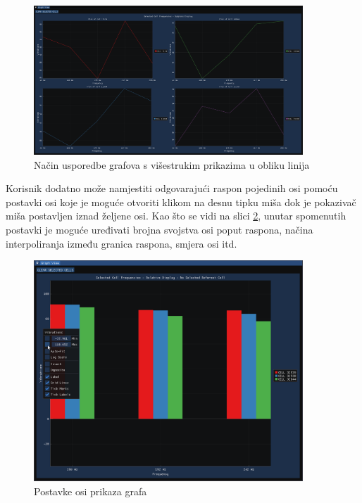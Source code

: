 \documentclass[times, utf8, diplomski]{fer}
\begin{document}
\begin{figure}[H]
	\centering
	\includegraphics[width=0.9\textwidth]{subplots_graph_display_lines.png}
	\caption{Način usporedbe grafova s višestrukim prikazima u obliku linija}
    \label{fig:subplots_graph_display_lines}
\end{figure}

Korisnik dodatno može namjestiti odgovarajući raspon pojedinih osi pomoću postavki osi koje je moguće otvoriti klikom na desnu tipku miša dok je pokazivač miša postavljen iznad željene osi. Kao što se vidi na slici \ref{fig:graph-axis-settings}, unutar spomenutih postavki je moguće uređivati brojna svojstva osi poput raspona, načina interpoliranja između granica raspona, smjera osi itd.

\begin{figure} [H]
	\centering
    \includegraphics[width=0.9\textwidth]{graph_view_axis_settings.png}
    \caption{Postavke osi prikaza grafa}
    \label{fig:graph-axis-settings}
\end{figure}
\end{document}
